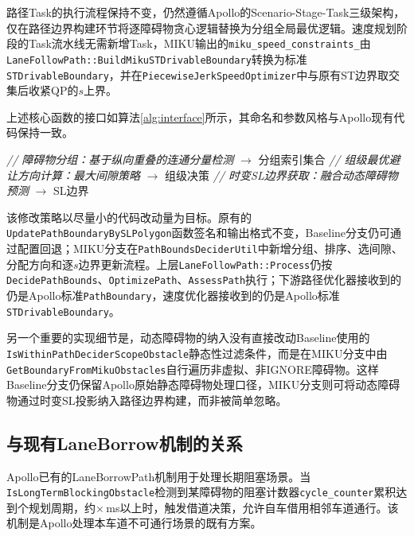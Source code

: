 路径Task的执行流程保持不变，仍然遵循Apollo的Scenario-Stage-Task三级架构，仅在路径边界构建环节将逐障碍物贪心逻辑替换为分组全局最优逻辑。速度规划阶段的Task流水线无需新增Task，MIKU输出的\texttt{miku\_speed\_constraints\_}由\texttt{LaneFollowPath::BuildMikuSTDrivableBoundary}转换为标准\texttt{STDrivableBoundary}，并在\texttt{PiecewiseJerkSpeedOptimizer}中与原有ST边界取交集后收紧QP的$s$上界。

上述核心函数的接口如算法\ref{alg:interface}所示，其命名和参数风格与Apollo现有代码保持一致。

\begin{algorithm}[htbp]
\caption{核心函数接口定义}
\label{alg:interface}
\textcolor{gray!30!black}{\textit{// 障碍物分组：基于纵向重叠的连通分量检测}}\;
 $\rightarrow$ 分组索引集合 \;
\textcolor{gray!30!black}{\textit{// 组级最优避让方向计算：最大间隙策略}}\;
 $\rightarrow$ 组级决策 \;
\textcolor{gray!30!black}{\textit{// 时变SL边界获取：融合动态障碍物预测}}\;
 $\rightarrow$ SL边界 \;
\end{algorithm}

该修改策略以尽量小的代码改动量为目标。原有的\texttt{UpdatePathBoundaryBySLPolygon}函数签名和输出格式不变，Baseline分支仍可通过配置回退；MIKU分支在\texttt{PathBoundsDeciderUtil}中新增分组、排序、选间隙、分配方向和逐$s$边界更新流程。上层\texttt{LaneFollowPath::Process}仍按\texttt{DecidePathBounds}、\texttt{OptimizePath}、\texttt{AssessPath}执行；下游路径优化器接收到的仍是Apollo标准\texttt{PathBoundary}，速度优化器接收到的仍是Apollo标准\texttt{STDrivableBoundary}。

另一个重要的实现细节是，动态障碍物的纳入没有直接改动Baseline使用的\texttt{IsWithinPathDeciderScopeObstacle}静态性过滤条件，而是在MIKU分支中由\texttt{GetBoundaryFromMikuObstacles}自行遍历非虚拟、非IGNORE障碍物。这样Baseline分支仍保留Apollo原始静态障碍物处理口径，MIKU分支则可将动态障碍物通过时变SL投影纳入路径边界构建，而非被简单忽略。

\subsection{与现有LaneBorrow机制的关系}
Apollo已有的LaneBorrowPath机制用于处理长期阻塞场景。当\texttt{IsLongTermBlockingObstacle}检测到某障碍物的阻塞计数器\texttt{cycle\_counter}累积达到\BorrowMaxDepth 个规划周期，约\BorrowMaxDepth{}$\times$\PlannerCycleMs\,ms以上时，触发借道决策，允许自车借用相邻车道通行。该机制是Apollo处理本车道不可通行场景的既有方案。

